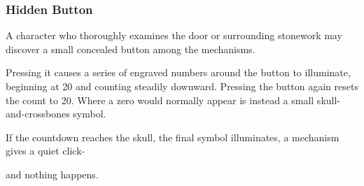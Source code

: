 \subsubsection*{Hidden Button}
{\entryfont A character who thoroughly examines the door or surrounding stonework may discover a small concealed button among the mechanisms.

Pressing it causes a series of engraved numbers around the button to illuminate, beginning at 20 and counting steadily downward. Pressing the button again resets the count to 20. Where a zero would normally appear is instead a small skull-and-crossbones symbol.

If the countdown reaches the skull, the final symbol illuminates, a mechanism gives a quiet click-

and nothing happens.}